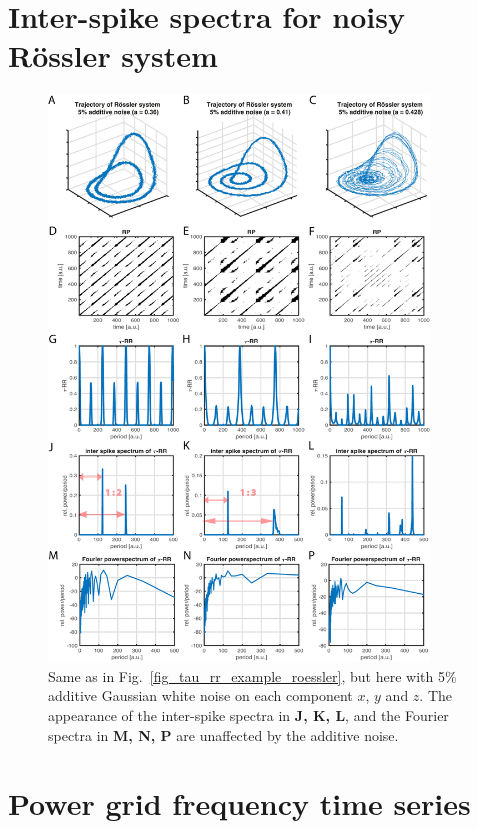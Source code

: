 \documentclass[entropy,article,submit,pdftex,moreauthors]{Definitions/mdpi}
\begin{document}
\section{Inter-spike spectra for noisy R\"ossler system}

\begin{figure}[h!]
 \centering
 \includegraphics[width=0.9\textwidth]{./figures/fig_tau_rr_example_roessler_noise}
 \caption{Same as in Fig.~\ref{fig_tau_rr_example_roessler}, but here with 5\% additive Gaussian white noise on each component $x$, $y$ and $z$. The appearance of the inter-spike spectra 
 in \textbf{J, K, L}, and the Fourier spectra in \textbf{M, N, P} are unaffected by the additive noise.}
\label{fig_tau_rr_example_roessler_noise}
\end{figure}

\section{Power grid frequency time series}\label{sec_power_grid_appendix}
\end{document}
